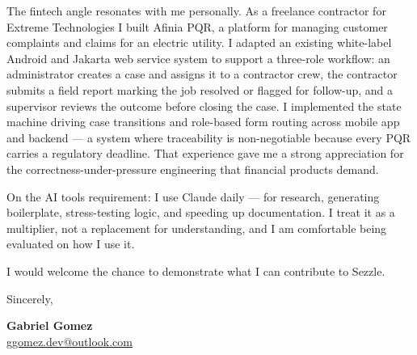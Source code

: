 \documentclass[letterpaper,11pt]{article}
\begin{document}
The fintech angle resonates with me personally. As a freelance contractor for Extreme Technologies I built Afinia PQR, a platform for managing customer complaints and claims for an electric utility. I adapted an existing white-label Android and Jakarta web service system to support a three-role workflow: an administrator creates a case and assigns it to a contractor crew, the contractor submits a field report marking the job resolved or flagged for follow-up, and a supervisor reviews the outcome before closing the case. I implemented the state machine driving case transitions and role-based form routing across mobile app and backend --- a system where traceability is non-negotiable because every PQR carries a regulatory deadline. That experience gave me a strong appreciation for the correctness-under-pressure engineering that financial products demand.

On the AI tools requirement: I use Claude daily --- for research, generating boilerplate, stress-testing logic, and speeding up documentation. I treat it as a multiplier, not a replacement for understanding, and I am comfortable being evaluated on how I use it.

I would welcome the chance to demonstrate what I can contribute to Sezzle.

\vspace{1.5em}

Sincerely,

\vspace{0.4em}

\textbf{Gabriel Gomez}\\
\href{mailto:ggomez.dev@outlook.com}{ggomez.dev@outlook.com}
\end{document}
